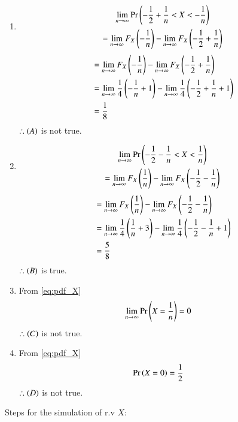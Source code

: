 \documentclass[journal,12pt,twocolumn]{IEEEtran}
\theoremstyle{remark}
\begin{document}
\begin{enumerate}[label=(\Alph*)]
    \item \begin{multline} 
    		\lim_{n \to \infty} \Pr\left(-\frac{1}{2} + \frac{1}{n} < X < -\frac{1}{n}\right) \\= \lim_{n \to \infty}F_X\left(-\frac{1}{n}\right)-\lim_{n \to \infty}F_X\left(-\frac{1}{2} + \frac{1}{n}\right)
	\end{multline}
	\begin{align}
    		&= \lim_{n \to \infty}F_X\left(-\frac{1}{n}\right) - \lim_{n \to \infty}F_X\left(-\frac{1}{2} + \frac{1}{n}\right)\\
    	&= \lim_{n \to \infty}\frac{1}{4}\left(-\frac{1}{n}+1\right)-\lim_{n \to \infty}\frac{1}{4}\left(-\frac{1}{2} + \frac{1}{n}+1\right)\\
    	&= \frac{1}{8}
    	\end{align}
    	$\therefore \left(A\right)$ is not true.
    	
    \item \begin{multline} 
    		\lim_{n \to \infty} \Pr\left(-\frac{1}{2} - \frac{1}{n} < X < \frac{1}{n}\right) \\= \lim_{n \to \infty}F_X\left(\frac{1}{n}\right) -\lim_{n \to \infty}F_X\left(-\frac{1}{2} - \frac{1}{n}\right)
	\end{multline}
	\begin{align}
    		&= \lim_{n \to \infty} F_X\left(\frac{1}{n}\right) - \lim_{n \to \infty}F_X\left(-\frac{1}{2} - \frac{1}{n}\right)\\
    	&= \lim_{n \to \infty}\frac{1}{4}\left(\frac{1}{n}+3\right)-\lim_{n \to \infty}\frac{1}{4}\left(-\frac{1}{2} - \frac{1}{n}+1\right)\\
    	&= \frac{5}{8}
    	\end{align}
    	$\therefore \left(B\right)$ is true.
    	
    \item From \eqref{eq:pdf_X}
    \begin{align}
    		\lim_{n \to \infty} \Pr\left(X = \frac{1}{n}\right) &= 0
    	\end{align}
    	$\therefore \left(C\right)$ is not true.
    	
    	\item From \eqref{eq:pdf_X}
    	\begin{align}
    		\Pr\left(X = 0\right) &= \frac{1}{2}
    	\end{align}
    	$\therefore \left(D\right)$ is not true.
\end{enumerate}
Steps for the simulation of r.v $X$:
\end{document}
